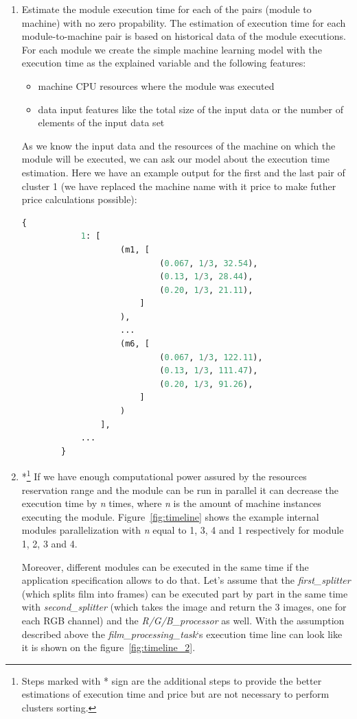 \documentclass{article}
\begin{document}
\begin{enumerate}
		\item Estimate the module execution time for each of the pairs (module to machine) with no zero propability. The estimation of execution time for each module-to-machine pair is based on historical data of the module executions. For each module we create the simple machine learning model with the execution time as the explained variable and the following features:
		\begin{itemize}
			\item machine CPU resources where the module was executed
			\item data input features like the total size of the input data or the number of elements of the input data set
		\end{itemize}
		As we know the input data and the resources of the machine on which the module will be executed, we can ask our model about the execution time estimation.
		Here we have an example output for the first and the last pair of cluster 1 (we have replaced the machine name with it price to make futher price calculations possible): 
		\begin{lstlisting}[language=Python]
		{
			1: [
					(m1, [
							(0.067, 1/3, 32.54),
							(0.13, 1/3, 28.44),
							(0.20, 1/3, 21.11),
						]
					),
					...
					(m6, [
							(0.067, 1/3, 122.11),
							(0.13, 1/3, 111.47),
							(0.20, 1/3, 91.26),
						]
					)
				],
			...
		}
		\end{lstlisting}
		\item*\footnote{Steps marked with * sign are the additional steps to provide the better estimations of execution time and price but are not necessary to perform clusters sorting.} If we have enough computational power assured by the resources reservation range and the module can be run in parallel it can decrease the execution time by \textit{n} times, where \textit{n} is the amount of machine instances executing the module. Figure~\ref{fig:timeline} shows the example internal modules parallelization with \textit{n} equal to 1, 3, 4 and 1 respectively for module 1, 2, 3 and 4.
		
		Moreover, different modules can be executed in the same time if the application specification allows to do that. Let's assume that the \textit{first\_splitter} (which splits film into frames) can be executed part by part in the same time with \textit{second\_splitter} (which takes the image and return the 3 images, one for each RGB channel) and the \textit{R/G/B\_processor} as well. 
		With the assumption described above the \textit{film\_processing\_task}`s execution time line can look like it is shown on the figure~\ref{fig:timeline_2}.
		

\end{enumerate}
\end{document}
